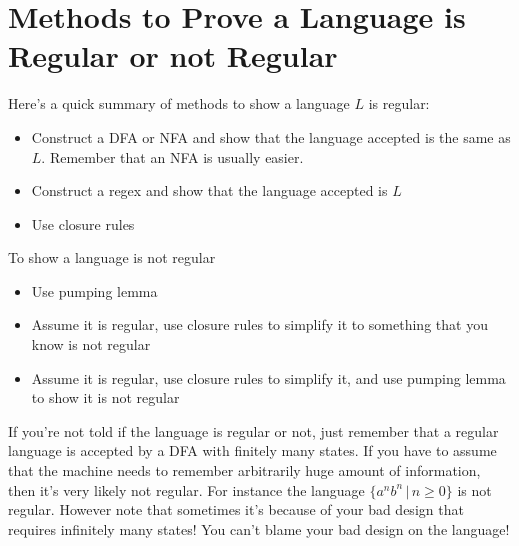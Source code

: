 \section{Methods to Prove a Language is Regular or not Regular}

Here's a quick summary of methods to show a language $L$ is
regular:
\begin{itemize}
 \item Construct a DFA or NFA and show that the language accepted
 is the same as $L$. Remember that an NFA is usually easier.
 \item Construct a regex and show that the language accepted is
 $L$
 \item Use closure rules
\end{itemize}

To show a language is not regular
\begin{itemize}
 \item Use pumping lemma
 \item Assume it is regular, use closure rules to simplify it to
 something that you know is not regular
 \item Assume it is regular, use closure rules to simplify it, and
 use pumping lemma to show it is not regular
\end{itemize}

If you're not told if the language is regular or not, just
remember that a regular language is accepted by a DFA with
finitely many states. If you have to assume that the machine needs
to remember arbitrarily huge amount of information, then it's very
likely not regular. For instance the language $\{a^nb^n \,|\, n
\geq 0\}$ is not regular. However note that sometimes it's because
of your bad design that requires infinitely many states! You can't
blame your bad design on the language!
